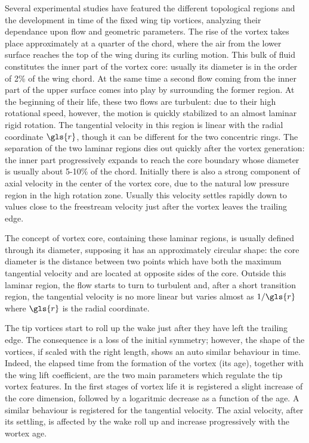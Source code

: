 Several experimental studies have featured the different topological regions and the development in time of the fixed wing tip vortices, analyzing their dependance upon flow and geometric parameters. The rise of the vortex takes place approximately at a quarter of the chord, where the air from the lower surface reaches the top of the wing during its curling motion. This bulk of fluid constitutes the inner part of the vortex core: usually its diameter is in the order of 2\% of the wing chord. At the same time a second flow coming from the inner part of the upper surface comes into play by surrounding the former region. At the beginning of their life, these two flows are turbulent: due to their high rotational speed, however, the motion is quickly stabilized to an almost laminar rigid rotation. The tangential velocity in this region is linear with the radial coordinate $\gls{r}$, though it can be different for the two concentric rings. The separation of the two laminar regions dies out quickly after the vortex  generation: the inner part progressively expands to reach the core boundary whose diameter is usually about 5-10\% of the chord. Initially there is also a strong component of axial velocity in the center of the vortex core, due to the natural low pressure region in the high rotation zone. Usually this velocity settles rapidly down to values close to the freestream velocity just after the vortex leaves the trailing edge.

The concept of vortex core, containing these laminar regions, is usually defined through its diameter, supposing it has an approximately circular shape: the core diameter is the distance between two points which have both the maximum tangential velocity and are located at opposite sides of the core. Outside this laminar region, the flow starts to turn to turbulent and, after a short transition region, the tangential velocity is no more linear but varies almost as $1/\gls{r}$ where $\gls{r}$ is the radial coordinate.

The tip vortices start to roll up the wake just after they have left the trailing edge. The consequence is a loss of the initial symmetry; however, the shape of the vortices, if scaled with the right length, shows an auto similar behaviour in time. Indeed, the elapsed time from the formation of the vortex (its age), together with the wing lift coefficient, are the two main parameters which regulate the tip vortex features. In the first stages of vortex life it is registered a slight increase of the core dimension, followed by a logaritmic decrease as a function of the age. A similar behaviour is registered for the tangential velocity. The axial velocity, after its settling, is affected by the wake roll up and increase progressively with the wortex age.

